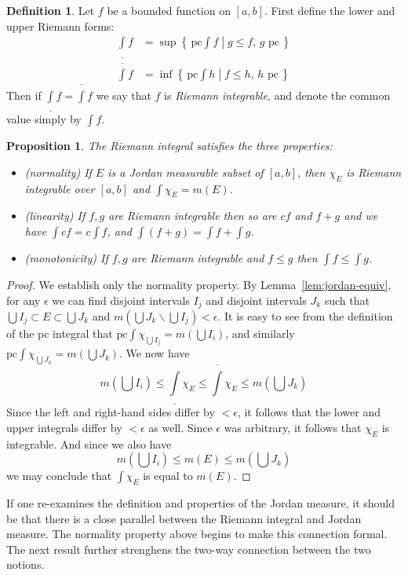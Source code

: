 \documentclass[11pt,oneside]{amsbook}
\newcommand{\set}[1]{\left\{\,#1\,\right\}}
\renewcommand{\setminus}{\smallsetminus}
\newcommand{\lint}{\underline\int}
\newcommand{\ovint}{\overline\int}
\theoremstyle{definition}
\theoremstyle{plain}
\newtheorem{prop}[thm]{Proposition}
\theoremstyle{definition}
\newtheorem{defn}[thm]{Definition}
\theoremstyle{remark}
\numberwithin{equation}{section}
\numberwithin{figure}{section}
\begin{document}
\begin{defn}
  Let $f$ be a bounded function on $[a,b]$. First define the lower and upper Riemann forms:
  \begin{align*}
    \lint f&=\sup\set{\left.\text{pc}\!\!\int\!\! f\;\right|\;g\leq f\text{, $g$ pc}}\\
    \ovint f&=\inf\set{\left.\text{pc}\!\!\int\!\! h\;\right|\;f\leq h\text{, $h$ pc}}
  \end{align*}
  Then if $\lint f=\ovint f$ we say that $f$ is \emph{Riemann integrable}, and denote the common value simply by $\int f$.
\end{defn}

\begin{prop}
  The Riemann integral satisfies the three properties:
  \begin{itemize}
  \item (normality) If $E$ is a Jordan measurable subset of $[a,b]$, then $\chi_E$ is Riemann integrable over $[a,b]$ and $\int\chi_E=m(E)$.
  \item (linearity) If $f,g$ are Riemann integrable then so are $cf$ and $f+g$ and we have $\int cf=c\int f$, and $\int(f+g)=\int f+\int g$.
  \item (monotonicity) If $f,g$ are Riemann integrable and $f\leq g$ then $\int f\leq \int g$.
  \end{itemize}
\end{prop}

\begin{proof}
  We establish only the normality property. By Lemma~\ref{lem:jordan-equiv}, for any $\epsilon$ we can find disjoint intervals $I_j$ and disjoint intervals $J_k$ such that $\bigcup I_j\subset E\subset\bigcup J_k$ and $m(\bigcup J_k\setminus\bigcup I_j)<\epsilon$. It is easy to see from the definition of the pc integral that $\text{pc}\int\chi_{\bigcup I_j}=m(\bigcup I_i)$, and similarly $\text{pc}\int\chi_{\bigcup J_k}=m(\bigcup J_k)$. We now have
  \[m(\bigcup I_i)\leq\lint\chi_E\leq\ovint\chi_E
  \leq m(\bigcup J_k)
  \]
  Since the left and right-hand sides differ by $<\epsilon$, it follows that the lower and upper integrals differ by $<\epsilon$ as well. Since $\epsilon$ was arbitrary, it follows that $\chi_E$ is integrable. And since we also have
  \[m(\bigcup I_i)\leq m(E)\leq m(\bigcup J_k)
  \]
  we may conclude that $\int\chi_E$ is equal to $m(E)$.
\end{proof}

If one re-examines the definition and properties of the Jordan measure, it should be that there is a close parallel between the Riemann integral and Jordan measure. The normality property above begins to make this connection formal. The next result further strenghens the two-way connection between the two notions.
\end{document}
